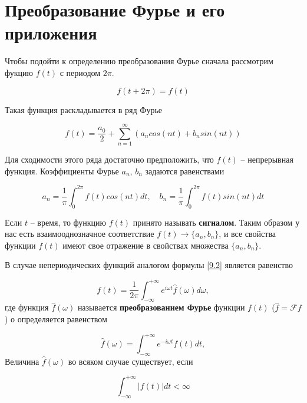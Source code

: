 \section{Преобразование Фурье и его приложения}
\label{lecture9}

Чтобы подойти к определению преобразования Фурье сначала рассмотрим фукцию $f(t)$ с периодом $2\pi$.

\begin{equation}\label{9.1}
	f(t+2\pi) = f(t)
\end{equation}

Такая функция раскладывается в ряд Фурье 

\begin{equation}\label{9.2}
f(t) = \frac{a_0}{2} + \sum_{n = 1}^{\infty}(a_n cos(nt) + b_n sin(nt)) 
\end{equation}

Для сходимости этого ряда достаточно предположить, что $f(t)$ -- непрерывная функция.
Коэффициенты Фурье $a_n$, $b_n$ задаются равенствами

\begin{equation}\label{9.3}
a_n = \frac{1}{\pi} \int_{0}^{2\pi} f(t) cos(nt) dt,\quad b_n = \frac{1}{\pi} \int_{0}^{2\pi} f(t) sin(nt) dt
\end{equation} 

Если $t$ -- время, то функцию $f(t)$ принято называть \textbf{сигналом}. 
Таким образом у нас есть взаимооднозначное соответствие $f(t) \rightarrow \{a_n, b_n\}$, и все свойства функции $f(t)$ имеют свое отражение в свойствах множества $\{a_n, b_n\}$.

В случае непериодических функций аналогом формулы \ref{9.2} является равенство 

\begin{equation}\label{9.4}
f(t) = \frac{1}{2\pi}\int_{-\infty}^{+\infty} e^{i\omega t} \hat{f} (\omega) d\omega,
\end{equation}
где функция $\hat{f}(\omega)$ называется \textbf{преобразованием Фурье} функции $f(t)$ ($ \hat{f} = \mathscr{F} f$)
о определяется равенством 

\begin{equation}\label{9.5}
\hat{f} (\omega) = \int_{-\infty}^{+\infty} e^{-i\omega t} f(t) dt,
\end{equation}
Величина $\hat{f} (\omega)$ во всяком случае существует, если 

\begin{equation}\label{9.6}
\int_{-\infty}^{+\infty} |f(t)| dt < \infty
\end{equation}


